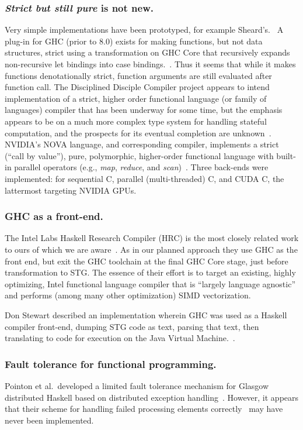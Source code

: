 \documentclass{llncs}
\begin{document}
\subsubsection{\emph{Strict but still pure} is not new.}
Very simple implementations have been prototyped, for example
Sheard's.~\cite{Sheard:2003}
%
A plug-in for GHC (prior to 8.0) exists for making functions, but not data
structures, strict using a transformation on GHC Core that recursively expands
non-recursive let bindings into case bindings.~\cite{strict-ghc-plugin}.  Thus
it seems that while it makes functions denotationally strict, function
arguments are still evaluated after function call.
%
The Disciplined Disciple Compiler project appears to intend implementation of
a strict, higher order functional language (or family of languages) compiler
that has been underway for some time, but the emphasis appears to be on a much
more complex type system for handling stateful computation, and the prospects
for its eventual completion are unknown~\cite{disciplined-disciple}.
%
NVIDIA's NOVA language, and corresponding compiler, implements a strict
(``call by value''), pure, polymorphic, higher-order functional language with
built-in parallel operators (e.g., \emph{map}, \emph{reduce}, and
\emph{scan})~\cite{NVIDIA:2013}. Three back-ends were implemented: for
sequential C, parallel (multi-threaded) C, and CUDA C, the lattermost
targeting NVIDIA GPUs.

\subsubsection{GHC as a front-end.}
The Intel Labs Haskell Research Compiler (HRC) is the most closely related
work to ours of which we are aware~\cite{Liu:2013,Petersen:2013}.  As in our
planned approach they use GHC as the front end, but exit the GHC toolchain
at the final GHC Core stage, just before transformation to STG.  The essence
of their effort is to target an existing, highly optimizing, Intel functional
language compiler that is ``largely language agnostic'' and performs (among
many other optimization) SIMD vectorization.

Don Stewart described an implementation wherein GHC was used as a Haskell compiler
front-end, dumping STG code as text, parsing that text, then translating to
code for execution on the Java Virtual Machine.~\cite{Stewart-BSc}.

\subsubsection{Fault tolerance for functional programming.}
Pointon et al.\ developed a limited fault tolerance mechanism for Glasgow
distributed Haskell based on distributed exception
handling~\cite{Pointon:2001}.  However, it appears that their scheme for
handling failed processing elements correctly~\cite{} may have never been
implemented.
\end{document}

